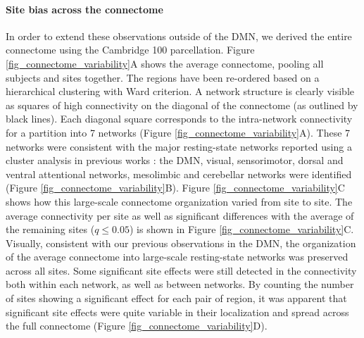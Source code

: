\documentclass[authoryear]{elsarticle}
\begin{document}
\paragraph{Site bias across the connectome} In order to extend these
observations outside of the DMN, we derived the entire connectome using the
Cambridge 100 parcellation. Figure \ref{fig_connectome_variability}A shows the
average connectome, pooling all subjects and sites together. The regions have
been re-ordered based on a hierarchical clustering with Ward criterion. A
network structure is clearly visible as squares of high connectivity on the
diagonal of the connectome (as outlined by black lines). Each diagonal square
corresponds to the intra-network connectivity for a partition into 7 networks (Figure \ref{fig_connectome_variability}A). These 7 networks were
consistent with the major resting-state networks reported using a cluster
analysis in previous works \citep[e.g.][]{Heuvel2008, Bellec2010, Yeo2011,
Power2011}: the DMN, visual, sensorimotor, dorsal and ventral attentional
networks, mesolimbic and cerebellar networks were
identified (Figure \ref{fig_connectome_variability}B). Figure \ref{fig_connectome_variability}C shows how this large-scale
connectome organization varied from site to site. The average connectivity per
site as well as significant differences with the average of the remaining sites
($q\leq 0.05$) is shown in Figure \ref{fig_connectome_variability}C.
Visually, consistent with our previous observations in the DMN, the organization
of the average connectome into large-scale resting-state networks was preserved
across all sites. 
Some significant site effects were still detected in the connectivity both within each network, as well as between networks. By counting the number of sites showing a significant effect for each pair of region, it was apparent that significant site effects were quite variable in their localization and spread across the full connectome (Figure \ref{fig_connectome_variability}D).  

\end{document}
